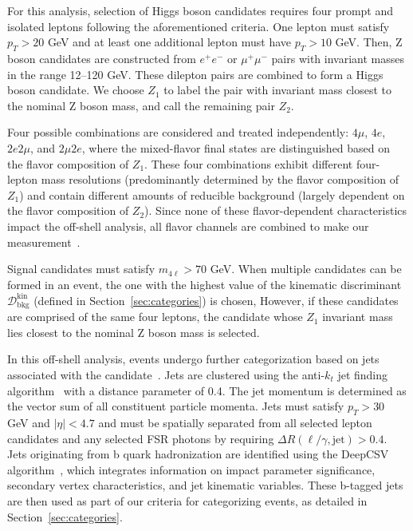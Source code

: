 

For this analysis, selection of Higgs boson candidates requires four prompt and isolated leptons following the aforementioned criteria. One lepton must satisfy $p_T>20$ GeV and at least one additional lepton must have $p_T>10$ GeV. Then, Z boson candidates are constructed from $e^+e^-$ or $\mu^+\mu^-$ pairs with invariant masses in the range 12--120 GeV. These dilepton pairs are combined to form a Higgs boson candidate. 
We choose $Z_1$ to label the pair with invariant mass closest to the nominal Z boson mass, 
and call the remaining pair $Z_2$. 

Four possible combinations are considered and treated independently: 
$4\mu$, $4e$, $2e2\mu$, and $2\mu2e$, where the mixed-flavor final states are distinguished based on the flavor composition of $Z_{1}$. These four combinations exhibit different four-lepton mass resolutions (predominantly determined by the flavor composition of $Z_{1}$) and contain different amounts of reducible background (largely dependent on the flavor composition of $Z_{2}$). Since none of these flavor-dependent characteristics impact the off-shell \Hboson analysis, all flavor channels are combined to make our measurement~\cite{PhysRevD.111.092014}. 

Signal candidates must satisfy $m_{4\ell} > 70$ GeV. When multiple \Hboson candidates can be formed in an event, the one with the highest value of the kinematic discriminant $\mathcal{D}_\text{bkg}^\text{kin}$ (defined in Section~\ref{sec:categories}) is chosen, However, if these \Hboson candidates are comprised of the same four leptons, the candidate whose $Z_1$ invariant mass lies closest to the nominal Z boson mass is selected.

In this off-shell analysis, events undergo further categorization based on jets associated with the \Hboson candidate~\cite{PhysRevD.111.092014}. Jets are clustered using the anti-$k_t$ jet finding algorithm~\cite{Cacciari:2008gp,Cacciari:2011ma} with a distance parameter of 0.4. The jet momentum is determined as the vector sum of all constituent particle momenta. 
Jets must satisfy $p_T>30$ GeV and $|\eta|<4.7$ and must be spatially separated
from all selected lepton candidates and any selected FSR photons by requiring 
$\Delta R(\ell/\gamma,\text{jet})>0.4$.
Jets originating from b quark hadronization are identified using the DeepCSV algorithm~\cite{Sirunyan:2017ezt}, which integrates information 
on impact parameter significance, secondary vertex characteristics, and jet kinematic variables. These b-tagged jets are then used as part of our criteria for categorizing events, as detailed in Section~\ref{sec:categories}.

